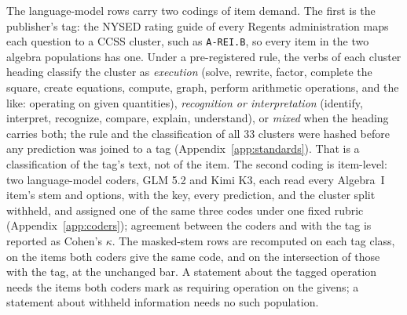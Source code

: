 The language-model rows carry two codings of item demand. The first is the publisher's tag: the NYSED rating guide of every Regents administration maps each question to a CCSS cluster, such as \texttt{A-REI.B}, so every item in the two algebra populations has one. Under a pre-registered rule, the verbs of each cluster heading classify the cluster as \emph{execution} (solve, rewrite, factor, complete the square, create equations, compute, graph, perform arithmetic operations, and the like: operating on given quantities), \emph{recognition or interpretation} (identify, interpret, recognize, compare, explain, understand), or \emph{mixed} when the heading carries both; the rule and the classification of all 33 clusters were hashed before any prediction was joined to a tag (Appendix~\ref{app:standards}). That is a classification of the tag's text, not of the item. The second coding is item-level: two language-model coders, GLM 5.2 and Kimi K3, each read every Algebra~I item's stem and options, with the key, every prediction, and the cluster split withheld, and assigned one of the same three codes under one fixed rubric (Appendix~\ref{app:coders}); agreement between the coders and with the tag is reported as Cohen's $\kappa$. The masked-stem rows are recomputed on each tag class, on the items both coders give the same code, and on the intersection of those with the tag, at the unchanged bar. A statement about the tagged operation needs the items both coders mark as requiring operation on the givens; a statement about withheld information needs no such population.
